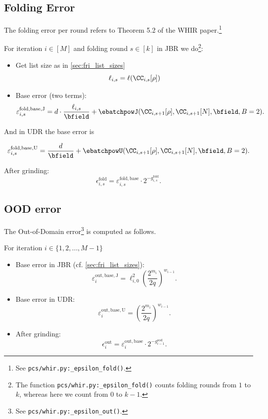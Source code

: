\subsection{Folding Error}

The folding error per round refers to Theorem 5.2 of the WHIR paper.\footnote{See \texttt{pcs/whir.py:\_epsilon\_fold()}.}

For iteration \(i\in[M]\) and folding round \(s\in[k]\) in JBR we do\footnote{The function \texttt{pcs/whir.py:\_epsilon\_fold()}
counts folding rounds from \(1\) to \(k\), whereas here we count from \(0\) to \(k-1\).    }:
\begin{itemize}
    \item %
    Get list size as in \cref{sec:fri_list_sizes}
    $$
    \ell_{i,s} =\ell(\CC_{i,s}[\rho])
    $$
    \item
Base error (two terms):
\[
  \varepsilon^{\mathrm{fold,base,J}}_{i,s}
    = d \cdot \frac{\ell_{i,s}}{\bfield}
      + \ebatchpowJ(\CC_{i,s+1}[\rho],\CC_{i,s+1}[N],\bfield,B=2).
\]
\end{itemize} And in UDR the base error is

\[
  \varepsilon^{\mathrm{fold,base,U}}_{i,s}
    =  \frac{d}{\bfield}
      + \ebatchpowU(\CC_{i,s+1}[\rho],\CC_{i,s+1}[N],\bfield,B=2).
\]

After grinding:
\[
  \epsilon^{\mathrm{fold}}_{i,s}
    = \varepsilon^{\mathrm{fold,base}}_{i,s}
      \cdot 2^{-g^{\mathrm{fold}}_{i,s}}.
\]

\subsection{OOD error }

The Out-of-Domain error\footnote{See \texttt{pcs/whir.py:\_epsilon\_out()}.} is computed as follows.

For iteration \(i\in\{1,2,\ldots,M-1\}\)
\begin{itemize}
    \item
Base error in JBR (cf. \cref{sec:fri_list_sizes}):
\[
  \varepsilon^{\mathrm{out,base,J}}_i
  = \ell_{i,0}^2
    \left(\frac{2^{m_i}}{2q}\right)^{w_{i-1}}.
\]
\item Base error in UDR:
\[
  \varepsilon^{\mathrm{out,base,U}}_i
  =  \left(\frac{2^{m_i}}{2q}\right)^{w_{i-1}}.
\]
\item After grinding:
\[
  \epsilon^{\mathrm{out}}_i
  = \varepsilon^{\mathrm{out,base}}_i
    \cdot 2^{-g^{\mathrm{ood}}_{i-1}}.
\]

\end{itemize}
